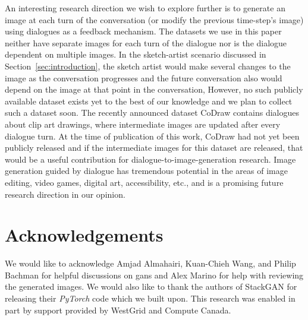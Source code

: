 \documentclass{article}
\begin{document}
An interesting research direction we wish to explore further is to generate an image at each turn of the conversation (or modify the previous time-step's image) using dialogues as a feedback mechanism. The datasets we use in this paper neither have separate images for each turn of the dialogue nor is the dialogue dependent on multiple images. In the sketch-artist scenario discussed in Section~\ref{sec:introduction}, the sketch artist would make several changes to the image as the conversation progresses and the future conversation also would depend on the image at that point in the conversation, However, no such publicly available dataset exists yet to the best of our knowledge and we plan to collect such a dataset soon. The recently announced dataset CoDraw \cite{kim2017codraw} contains dialogues about clip art drawings, where intermediate images are updated after every dialogue turn. At the time of publication of this work, CoDraw had not yet been publicly released and if the intermediate images for this dataset are released, that would be a useful contribution for dialogue-to-image-generation research. Image generation guided by dialogue has tremendous potential in the areas of image editing, video games, digital art, accessibility, etc., and is a promising future research direction in our opinion.


\section*{Acknowledgements}
We would like to acknowledge Amjad Almahairi, Kuan-Chieh Wang, and Philip Bachman for helpful discussions on \glspl{gan} and Alex Marino for help with reviewing the generated images. We would also like to thank the authors of StackGAN for releasing their \textit{PyTorch} code which we built upon. This research was enabled in part by support provided by WestGrid and Compute Canada.




\end{document}
